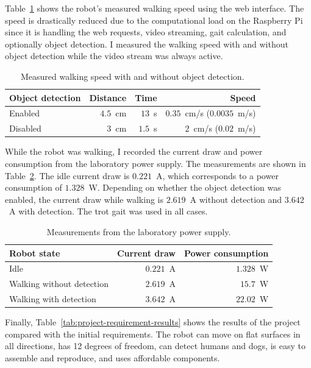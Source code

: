 \documentclass[a4paper,12pt]{report}
\begin{document}
Table~\ref{tab:detection-walking-speed} shows the robot's measured walking speed using the web
interface. The speed is drastically reduced due to the computational load on the Raspberry Pi since
it is handling the web requests, video streaming, gait calculation, and optionally object detection.
I measured the walking speed with and without object detection while the video stream was always
active.

\begin{table}[H]
\centering
\begin{tabular}{lrrr}
\hline
\textbf{Object detection} & \textbf{Distance} & \textbf{Time} & \textbf{Speed} \\
\hline
Enabled & $4.5$~cm & $13$~s & $0.35$~cm/s ($0.0035$~m/s) \\
Disabled & $3$~cm & $1.5$~s & $2$~cm/s ($0.02$~m/s) \\
\hline
\end{tabular}
\caption{Measured walking speed with and without object detection.}
\label{tab:detection-walking-speed}
\end{table}

While the robot was walking, I recorded the current draw and power consumption from the laboratory
power supply. The measurements are shown in Table~\ref{tab:robot-power-consumption}. The idle
current draw is $0.221$~A, which corresponds to a power consumption of $1.328$~W. Depending on
whether the object detection was enabled, the current draw while walking is $2.619$~A without
detection and $3.642$~A with detection. The trot gait was used in all cases.

\begin{table}[H]
\centering
\begin{tabular}{lrr}
\hline
\textbf{Robot state} & \textbf{Current draw} & \textbf{Power consumption} \\
\hline
Idle & $0.221$~A & $1.328$~W \\
Walking without detection & $2.619$~A & $15.7$~W \\
Walking with detection & $3.642$~A & $22.02$~W \\
\hline
\end{tabular}
\caption{Measurements from the laboratory power supply.}
\label{tab:robot-power-consumption}
\end{table}

Finally, Table~\ref{tab:project-requirement-results} shows the results of the project compared with
the initial requirements. The robot can move on flat surfaces in all directions, has 12 degrees of
freedom, can detect humans and dogs, is easy to assemble and reproduce, and uses affordable
components.
\end{document}
